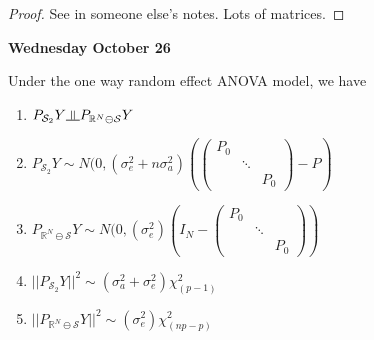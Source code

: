 \documentclass[11pt,fleqn]{book} %
\newcommand{\indep}{\rotatebox[origin=c]{90}{$\models$}}
\begin{document}
	\begin{proof}
		See in someone else's notes. Lots of matrices. 
	\end{proof}

\textbf{Wednesday October 26}\\

\begin{theorem}
	Under the one way random effect ANOVA model, we have 

		\begin{enumerate}
			\item $P_{\mathcal{S}_2} Y \indep P_{\mathbb{R}^N \ominus \mathcal{S}} Y$
			\item  $P_{\mathcal{S}_2} Y \sim N(0, (\sigma^2_e + n\sigma^2_a)(\begin{pmatrix}
				P_0 & & \\
				 & \ddots & \\
				 & & P_0
			\end{pmatrix} -P)$
			\item $P_{\mathbb{R}^N \ominus \mathcal{S}} Y \sim N(0, (\sigma^2_e)(I_N - \begin{pmatrix}
				P_0 & & \\
				 & \ddots & \\
				 & & P_0
			\end{pmatrix})$
			\item $|| P_{\mathcal{S}_2} Y||^2 \sim (\sigma^2_a + \sigma^2_e) \chi^2_{(p-1)}  $
			\item $|| P_{\mathbb{R}^N \ominus \mathcal{S}} Y||^2 \sim (\sigma^2_e) \chi^2_{(np-p)}  $
		\end{enumerate}
\end{theorem}
\end{document}

